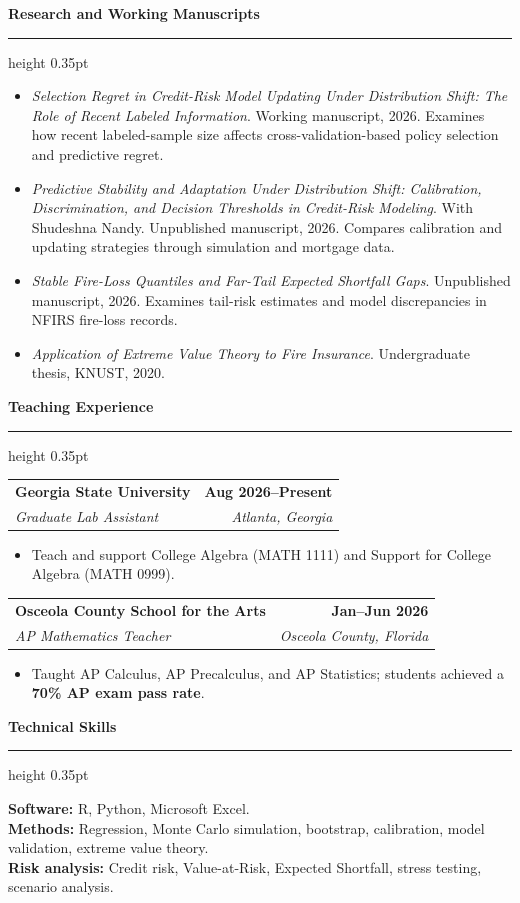 \documentclass[11pt,letterpaper]{article}
\makeatletter
\newcommand{\cvsection}[1]{%
  \par\addvspace{4pt}
  {\large\bfseries #1}\par
  \nobreak\vspace{1pt}
  \hrule height 0.35pt
  \nobreak\vspace{3pt}
}
\newcommand{\entry}[4]{%
  \noindent\hspace*{6pt}%
  \begin{tabular*}{\dimexpr\textwidth-12pt\relax}
    {@{}l@{\extracolsep{\fill}}r@{}}
    {\normalsize\bfseries #1} & {\small\bfseries #2}\\
    {\small\itshape #3} & {\small\itshape #4}\\
  \end{tabular*}\par
}
\makeatother
\begin{document}
\cvsection{Research and Working Manuscripts}
\begin{itemize}
\item \textit{Selection Regret in Credit-Risk Model Updating Under Distribution Shift: The Role of Recent Labeled Information}. Working manuscript, 2026. Examines how recent labeled-sample size affects cross-validation-based policy selection and predictive regret.
\item \textit{Predictive Stability and Adaptation Under Distribution Shift: Calibration, Discrimination, and Decision Thresholds in Credit-Risk Modeling}. With Shudeshna Nandy. Unpublished manuscript, 2026. Compares calibration and updating strategies through simulation and mortgage data.
\item \textit{Stable Fire-Loss Quantiles and Far-Tail Expected Shortfall Gaps}. Unpublished manuscript, 2026. Examines tail-risk estimates and model discrepancies in NFIRS fire-loss records.
\item \textit{Application of Extreme Value Theory to Fire Insurance}. Undergraduate thesis, KNUST, 2020.
\end{itemize}

\cvsection{Teaching Experience}


\entry
  {Georgia State University}
  {Aug 2026--Present}
  {Graduate Lab Assistant}
  {Atlanta, Georgia}

\begin{itemize}
  \item Teach and support College Algebra (MATH 1111) and
  Support for College Algebra (MATH 0999).
\end{itemize}

\vspace{2pt}

\entry
  {Osceola County School for the Arts}
  {Jan--Jun 2026}
  {AP Mathematics Teacher}
  {Osceola County, Florida}

\begin{itemize}
  \item Taught AP Calculus, AP Precalculus, and AP Statistics;
  students achieved a \textbf{70\% AP exam pass rate}.
\end{itemize}

\vspace{2pt}

\cvsection{Technical Skills}

\textbf{Software:}
R, Python, Microsoft Excel.\\
\textbf{Methods:}
Regression, Monte Carlo simulation, bootstrap,
calibration, model validation, extreme value theory.\\
\textbf{Risk analysis:}
Credit risk, Value-at-Risk, Expected Shortfall,
stress testing, scenario analysis.
\end{document}
